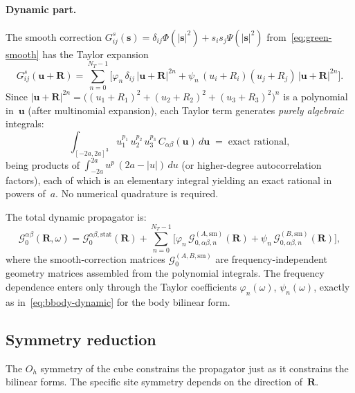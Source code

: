 \documentclass[11pt,a4paper]{article}
\newcommand{\bs}{\bm{s}}
\newcommand{\bu}{\bm{u}}
\newcommand{\Oh}{O_h}
\newcommand{\bR}{\bm{R}}
\newcommand{\Gprop}{\mathcal{G}_0}
\theoremstyle{plain}
\theoremstyle{definition}
\theoremstyle{remark}
\begin{document}
\paragraph{Dynamic part.}
The smooth correction
$G^s_{ij}(\bs) = \delta_{ij}\Phi(|\bs|^2) +
s_i s_j \Psi(|\bs|^2)$ from~\eqref{eq:green-smooth} has the Taylor
expansion
\begin{equation}
  G^s_{ij}(\bu + \bR) = \sum_{n=0}^{N_T - 1}
  \bigl[\varphi_n\,\delta_{ij}\,|\bu + \bR|^{2n}
  + \psi_n\,(u_i + R_i)(u_j + R_j)\,|\bu + \bR|^{2n}\bigr].
  \label{eq:Gs-shifted}
\end{equation}
Since $|\bu + \bR|^{2n} = \bigl((u_1 + R_1)^2 + (u_2 + R_2)^2 +
(u_3 + R_3)^2\bigr)^n$ is a polynomial in~$\bu$ (after multinomial
expansion), each Taylor term generates \emph{purely algebraic}
integrals:
\begin{equation}
  \int_{[-2a,2a]^3}\!u_1^{p_1}\,u_2^{p_2}\,u_3^{p_3}\,
    C_{\alpha\beta}(\bu)\,d\bu
  \;=\; \text{exact rational},
  \label{eq:smooth-poly}
\end{equation}
being products of $\int_{-2a}^{2a}\!u^p\,(2a - |u|)\,du$ (or
higher-degree autocorrelation factors), each of which is an
elementary integral yielding an exact rational in powers of~$a$.
No numerical quadrature is required.

The total dynamic propagator is:
\begin{equation}
  \Gprop^{\alpha\beta}(\bR, \omega)
  = \Gprop^{\alpha\beta,\mathrm{stat}}(\bR)
  + \sum_{n=0}^{N_T - 1}\bigl[
    \varphi_n\,\mathcal{G}_{0,\alpha\beta,n}^{(A,\mathrm{sm})}(\bR)
  + \psi_n\,\mathcal{G}_{0,\alpha\beta,n}^{(B,\mathrm{sm})}(\bR)
  \bigr],
  \label{eq:Gprop-dynamic}
\end{equation}
where the smooth-correction matrices
$\Gprop^{(A,B,\mathrm{sm})}$ are frequency-independent geometry
matrices assembled from the polynomial integrals.  The frequency
dependence enters only through the Taylor coefficients
$\varphi_n(\omega)$, $\psi_n(\omega)$, exactly as
in~\eqref{eq:bbody-dynamic} for the body bilinear form.


\subsection{Symmetry reduction}
\label{sec:symmetry-prop}

The $\Oh$ symmetry of the cube constrains the propagator just as it
constrains the bilinear forms.  The specific site symmetry depends
on the direction of~$\bR$.
\end{document}
